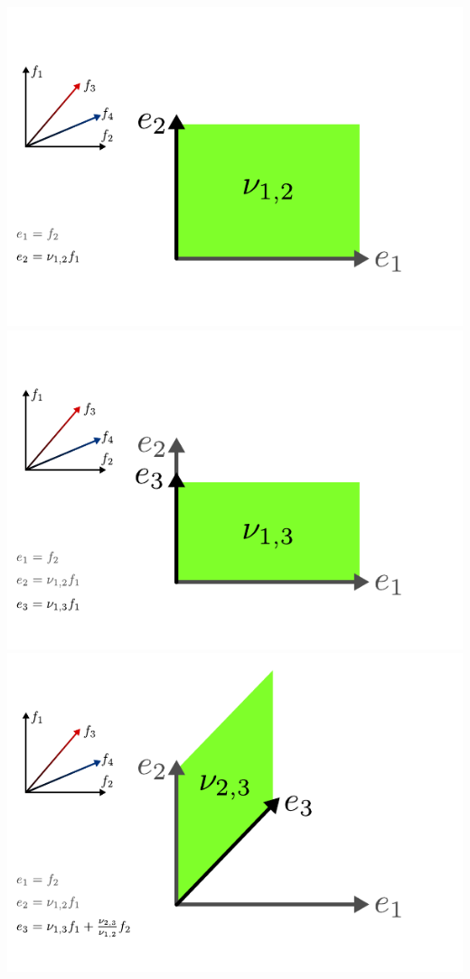 \documentclass[compress]{beamer}
\begin{document}
\begin{frame}
\begin{center}
\begin{overprint}
      \includegraphics[scale=1.0]{../img/recursionformula/07.pdf}
      \includegraphics[scale=1.0]{../img/recursionformula/08.pdf}
      \includegraphics[scale=1.0]{../img/recursionformula/09.pdf}

\end{overprint}
\end{center}
\end{frame}
\end{document}
